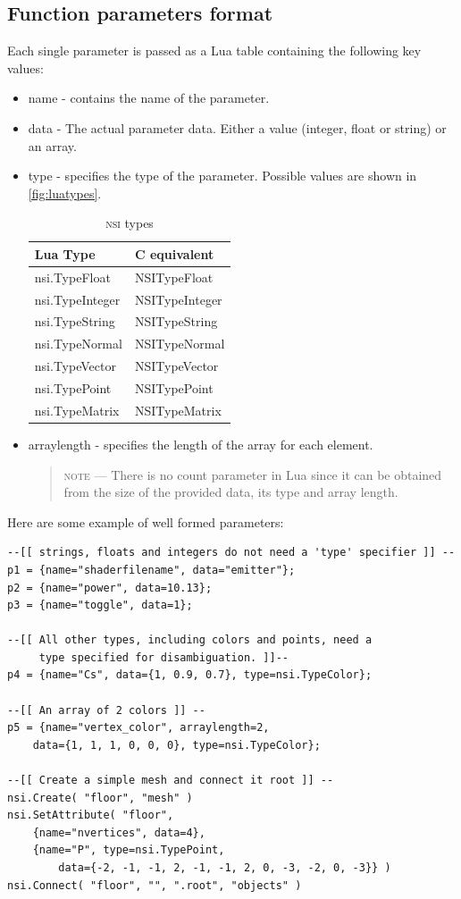 \documentclass[oneside,ebook]{memoir}
\newcommand*{\acronym}[1]{\textsc{\lowercase{#1}}}
\begin{document}
\subsection{Function parameters format}
Each single parameter is passed as a Lua table containing the following key values:
\begin{itemize}
\item name - contains the name of the parameter.
\item data - The actual parameter data. Either a value (integer, float or string) or an array.
\item type - specifies the type of the parameter. Possible values are shown in \autoref{fig:luatypes}.
\begin{table}[ht]
	\centering
	\begin{tabular}[c]{ll} \toprule
	\textbf{Lua Type} & \textbf{C equivalent} \\ \midrule
	nsi.TypeFloat & NSITypeFloat\\
	nsi.TypeInteger & NSITypeInteger\\
	nsi.TypeString & NSITypeString\\
	nsi.TypeNormal & NSITypeNormal\\
	nsi.TypeVector & NSITypeVector \\
	nsi.TypePoint & NSITypePoint \\
	nsi.TypeMatrix & NSITypeMatrix \\ \bottomrule
	\end{tabular}
	\caption{\acronym{NSI} types}\label{fig:luatypes}
\end{table}
\item arraylength - specifies the length of the array for each element.
\begin{quote}
\textsc{note} --- There is no count parameter in Lua since it can be obtained from the size of the provided data, its type and array length.
\end{quote}
\end{itemize}
Here are some example of well formed parameters:
\footnotesize
\begin{lstlisting}
--[[ strings, floats and integers do not need a 'type' specifier ]] --
p1 = {name="shaderfilename", data="emitter"};
p2 = {name="power", data=10.13};
p3 = {name="toggle", data=1};

--[[ All other types, including colors and points, need a
     type specified for disambiguation. ]]--
p4 = {name="Cs", data={1, 0.9, 0.7}, type=nsi.TypeColor};

--[[ An array of 2 colors ]] --
p5 = {name="vertex_color", arraylength=2,
	data={1, 1, 1, 0, 0, 0}, type=nsi.TypeColor};

--[[ Create a simple mesh and connect it root ]] --
nsi.Create( "floor", "mesh" )
nsi.SetAttribute( "floor",
	{name="nvertices", data=4},
	{name="P", type=nsi.TypePoint,
		data={-2, -1, -1, 2, -1, -1, 2, 0, -3, -2, 0, -3}} )
nsi.Connect( "floor", "", ".root", "objects" )
\end{lstlisting}
\normalsize
\end{document}
